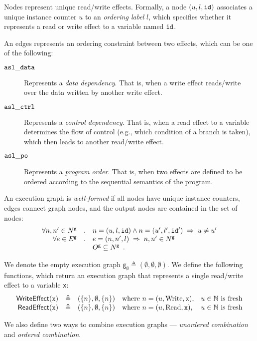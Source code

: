 \documentclass{book}
\newcommand\xgraph[0]{\textsf{g}}
\newcommand\emptygraph[0]{\xgraph_{\emptyset}}
\newcommand\Read[0]{\text{Read}}
\newcommand\Write[0]{\text{Write}}
\newcommand\WriteEffect[0]{\textsf{WriteEffect}}
\newcommand\ReadEffect[0]{\textsf{ReadEffect}}
\begin{document}
Nodes represent unique read/write effects. Formally, a node $(u,l,\texttt{id})$ associates a unique instance counter $u$
to an \emph{ordering label} $l$, which specifies whether it represents a read or write effect to a variable named $\texttt{id}$.

An edges represents an ordering constraint between two effects, which can be one of the following:
\begin{description}
\item[$\mathtt{asl\_data}$] Represents a \emph{data dependency}.
That is, when a write effect reads/write over the data written by another write effect.
\item[$\mathtt{asl\_ctrl}$] Represents a \emph{control dependency}.
That is, when a read effect to a variable determines the flow of control (e.g., which condition of a branch is taken),
which then leads to another read/write effect.
\item[$\mathtt{asl\_po}$] Represents a \emph{program order}.
That is, when two effects are defined to be ordered according to the sequential semantics of the program.
\end{description}

An execution graph is \emph{well-formed} if all nodes have unique instance counters, edges connect graph nodes,
and the output nodes are contained in the set of nodes:
\[
  \begin{array}{rcl}
  \forall n, n' \in N^\xgraph &.& n=(u,l,\id) \wedge n=(u',l',\id') \;\Rightarrow\; u \neq u' \\
  \forall e \in E^\xgraph &.& e=(n, n', l) \;\Rightarrow\; n, n' \in N^\xgraph \\
  & & O^\xgraph \subseteq N^\xgraph \enspace.
  \end{array}
\]

We denote the empty execution graph $\emptygraph \triangleq (\emptyset, \emptyset, \emptyset)$.
%
We define the following functions, which return an execution graph that represents a single read/write effect to a variable \texttt{x}:
\[
  \begin{array}{rclll}
    \WriteEffect(\texttt{x}) &\triangleq& (\{n\}, \emptyset, \{n\}) & \text{where } n=(u, \Write, \texttt{x}), & u\in\N \text{ is fresh}\\
    \ReadEffect(\texttt{x})  &\triangleq& (\{n\}, \emptyset, \{n\}) & \text{where } n=(u, \Read, \texttt{x}),   & u\in\N \text{ is fresh}\\
  \end{array}
\]

We also define two ways to combine execution graphs --- \emph{unordered combination} and \emph{ordered combination}.
\end{document}

